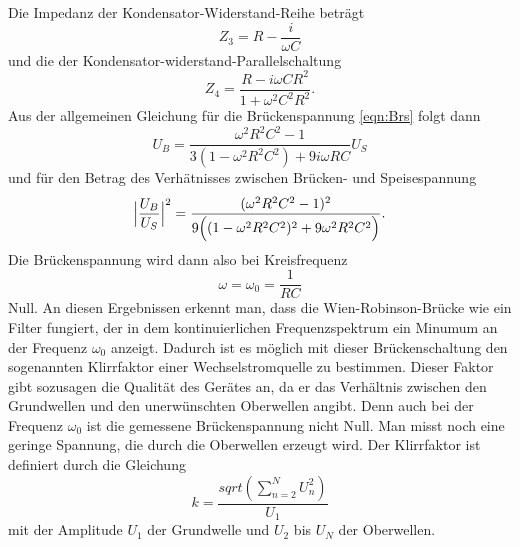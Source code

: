 Die Impedanz der Kondensator-Widerstand-Reihe beträgt
\begin{equation}
  Z_3 = R - \frac{i}{\omega C}
\end{equation}
und die der Kondensator-widerstand-Parallelschaltung
\begin{equation}
  Z_4 = \frac{R - i\omega C R^2}{1 + \omega^2 C^2 R^2} .
\end{equation}
Aus der allgemeinen Gleichung für die Brückenspannung \eqref{eqn:Brs}
folgt dann
\begin{equation}
  U_B = \frac{\omega^2 R^2 C^2 -1}{3(1 - \omega^2 R^2 C^2) + 9 i \omega R C}U_S
\end{equation}
und für den Betrag des Verhätnisses zwischen Brücken- und Speisespannung
\begin{equation}
  \Bigl|\frac{U_B}{U_S}\Bigr|^2 = \frac{(\omega^2 R^2 C^2 -1)^2}{9\Bigl
  ((1-\omega^2 R^2 C^2)^2 + 9 \omega^2 R^2 C^2\Bigr)} .
\end{equation}
Die Brückenspannung wird dann also bei Kreisfrequenz
\begin{equation}
  \omega = \omega_0 = \frac{1}{RC}
\end{equation}
Null.
An diesen Ergebnissen erkennt man, dass die Wien-Robinson-Brücke wie ein
Filter fungiert, der in dem kontinuierlichen Frequenzspektrum ein Minumum
an der Frequenz $\omega_0$ anzeigt. Dadurch ist es möglich mit dieser
Brückenschaltung den sogenannten Klirrfaktor einer Wechselstromquelle zu
bestimmen. Dieser Faktor gibt sozusagen die Qualität des Gerätes an, da er das
Verhältnis zwischen den Grundwellen und den unerwünschten Oberwellen angibt.
Denn auch bei der Frequenz $\omega_0$ ist die gemessene Brückenspannung nicht
Null. Man misst noch eine geringe Spannung, die durch die Oberwellen erzeugt
wird. Der Klirrfaktor ist definiert durch die Gleichung
\begin{equation}
  k = \frac{sqrt(\sum_{n=2}^N U_n^2)}{U_1}
\end{equation}
mit der Amplitude $U_1$ der Grundwelle und $U_2$ bis $U_N$ der Oberwellen.

\cite{sample}
